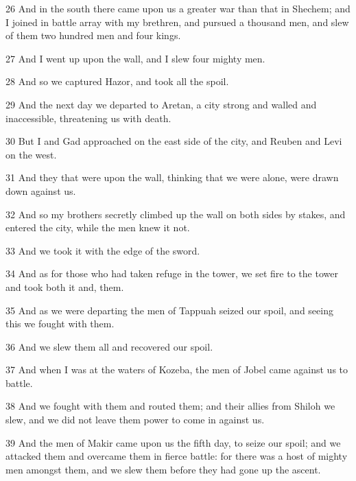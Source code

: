 \par 26 And in the south there came upon us a greater war than that in Shechem; and I joined in battle array with my brethren, and pursued a thousand men, and slew of them two hundred men and four kings.

\par 27 And I went up upon the wall, and I slew four mighty men.

\par 28 And so we captured Hazor, and took all the spoil.

\par 29 And the next day we departed to Aretan, a city strong and walled and inaccessible, threatening us with death.

\par 30 But I and Gad approached on the east side of the city, and Reuben and Levi on the west.

\par 31 And they that were upon the wall, thinking that we were alone, were drawn down against us.

\par 32 And so my brothers secretly climbed up the wall on both sides by stakes, and entered the city, while the men knew it not.

\par 33 And we took it with the edge of the sword.

\par 34 And as for those who had taken refuge in the tower, we set fire to the tower and took both it and, them.

\par 35 And as we were departing the men of Tappuah seized our spoil, and seeing this we fought with them.

\par 36 And we slew them all and recovered our spoil.

\par 37 And when I was at the waters of Kozeba, the men of Jobel came against us to battle.

\par 38 And we fought with them and routed them; and their allies from Shiloh we slew, and we did not leave them power to come in against us.

\par 39 And the men of Makir came upon us the fifth day, to seize our spoil; and we attacked them and overcame them in fierce battle: for there was a host of mighty men amongst them, and we slew them before they had gone up the ascent.

